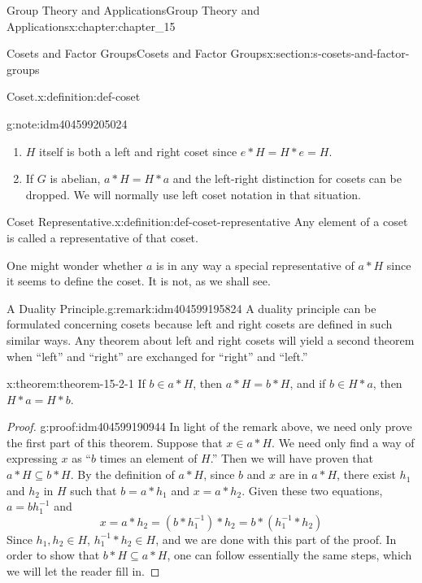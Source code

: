 \documentclass[twoside,10pt,]{book}
\numberwithin{equation}{section}
\begin{document}
\begin{chapterptx}{Group Theory and Applications}{}{Group Theory and Applications}{}{}{x:chapter:chapter_15}
\begin{sectionptx}{Cosets and Factor Groups}{}{Cosets and Factor Groups}{}{}{x:section:s-cosets-and-factor-groups}
\begin{definition}{Coset.}{x:definition:def-coset}
\begin{equation*}
\end{equation*}
%
\end{definition}
\begin{note}{}{g:note:idm404599205024}%
%
\begin{enumerate}[label=(\alph*)]
\item{}\(H\) itself is both a left and right coset since \(e*H = H*e = H\).%
\item{}If \(G\) is abelian, \(a*H = H*a\) and the left-right distinction for cosets can be dropped. We will normally use left coset notation in that situation.%
\end{enumerate}
%
\end{note}
\begin{definition}{Coset Representative.}{x:definition:def-coset-representative}%
%
Any element of a coset is called a representative of that coset.%
\end{definition}
One might wonder whether \(a\) is in any way a special representative of \(a*H\) since it seems to define the coset. It is not, as we shall see.%
\begin{remark}{A Duality Principle.}{g:remark:idm404599195824}%
A duality principle can be formulated concerning cosets because left and right cosets are defined in such similar ways. Any theorem about left and right cosets will yield a second theorem when ``left'' and ``right'' are exchanged for ``right'' and ``left.''%
\end{remark}
\begin{theorem}{}{}{x:theorem:theorem-15-2-1}%
If \(b\in a*H\), then \(a*H = b*H\), and if \(b \in  H*a\), then \(H*a = H*b\).%
\end{theorem}
\begin{proof}{}{g:proof:idm404599190944}
In light of the remark above, we need only prove the first part of this theorem. Suppose that \(x \in  a*H\).  We need only find a way of expressing \(x\) as ``\(b\) times an element of \(H\).'' Then we will have proven that \(a*H \subseteq  b*H\).  By the definition of \(a*H\), since \(b\) and \(x\) are in \(a*H\), there exist \(h_1\) and \(h_2\) in \(H\) such that \(b =
a*h_1\) and \(x = a*h_2\). Given these two equations, \(a = b h_1^{-1}\) and%
\begin{equation*}
x = a*h_2 = (b *h_1^{-1})*h_2 = b*(h_1^{-1}*h_2)
\end{equation*}
Since \(h_1,h_2 \in H\),   \(h_1^{-1}*h_2 \in H\), and we are done with this part of the proof.  In order to show that \(b*H \subseteq a*H\), one can follow essentially the same steps, which we will let the reader fill in.%

\end{proof}
\end{sectionptx}
\end{chapterptx}
\end{document}
